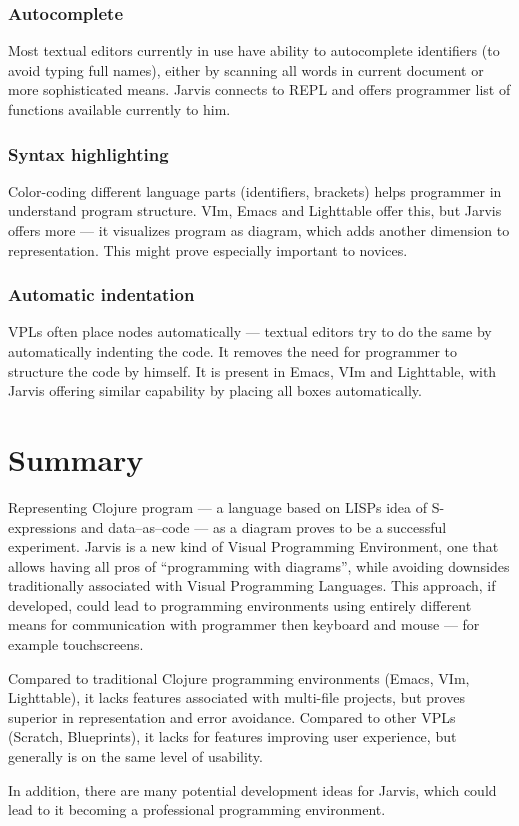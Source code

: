 \documentclass[11pt]{scrartcl}
\begin{document}
\subsubsection*{Autocomplete}
Most textual editors currently in use have ability to autocomplete identifiers
(to avoid typing full names), either by scanning all words in current document
or more sophisticated means. Jarvis connects to REPL and offers programmer list
of functions available currently to him.
    
\subsubsection*{Syntax highlighting}
Color-coding different language parts (identifiers, brackets) helps programmer
in understand program structure. VIm, Emacs and Lighttable offer this, but
Jarvis offers more --- it visualizes program as diagram, which adds another
dimension to representation. This might prove especially important to novices.
    
\subsubsection*{Automatic indentation}
VPLs often place nodes automatically --- textual editors try to do the same by
automatically indenting the code. It removes the need for programmer to
structure the code by himself. It is present in Emacs, VIm and Lighttable, with
Jarvis offering similar capability by placing all boxes automatically.

\section{Summary}
Representing Clojure program --- a language based on LISPs idea of S-expressions and
data--as--code --- as a diagram proves to be a successful experiment.
Jarvis is a new kind of Visual Programming Environment, one that allows
having all pros of ``programming with diagrams'', while avoiding downsides
traditionally associated with Visual Programming Languages. This approach, if
developed, could lead to programming environments using entirely different means
for communication with programmer then keyboard and mouse --- for example
touchscreens.

Compared to traditional Clojure programming environments (Emacs, VIm,
Lighttable), it lacks features associated with
multi-file projects, but proves superior in representation and error avoidance.
Compared to other VPLs (Scratch, Blueprints), it lacks for features improving
user experience, but generally is on the same level of usability.

In addition, there are many potential development ideas for Jarvis, which could lead
to it becoming a professional programming environment.



\end{document}
